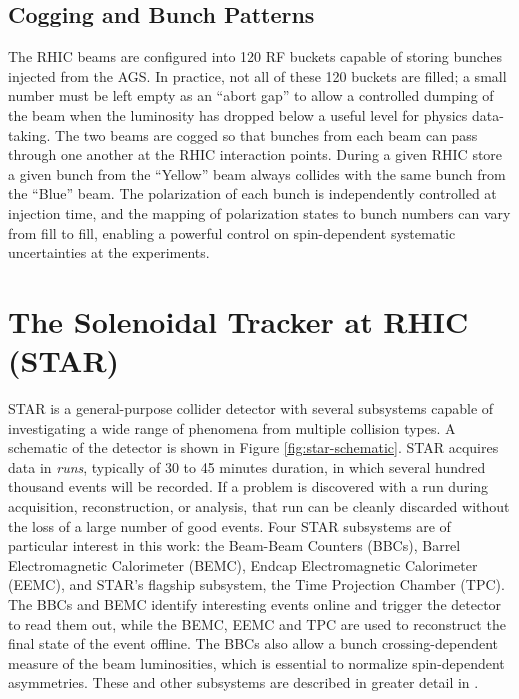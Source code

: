 \subsection{Cogging and Bunch Patterns}

The RHIC beams are configured into 120 RF buckets capable of storing bunches injected from the AGS.  In practice, not all of these 120 buckets are filled; a small number must be left empty as an ``abort gap'' to allow a controlled dumping of the beam when the luminosity has dropped below a useful level for physics data-taking.  The two beams are cogged so that bunches from each beam can pass through one another at the RHIC interaction points.  During a given RHIC store a given bunch from the ``Yellow'' beam always collides with the same bunch from the ``Blue'' beam.  The polarization of each bunch is independently controlled at injection time, and the mapping of polarization states to bunch numbers can vary from fill to fill, enabling a powerful control on spin-dependent systematic uncertainties at the experiments.

\section{The Solenoidal Tracker at RHIC (STAR)}

STAR \cite{Ackermann:2002ad} is a general-purpose collider detector with several subsystems capable of investigating a wide range of phenomena from multiple collision types.  A schematic of the detector is shown in Figure \ref{fig:star-schematic}.  STAR acquires data in \textit{runs}, typically of 30 to 45 minutes duration, in which several hundred thousand events will be recorded.  If a problem is discovered with a run during acquisition, reconstruction, or analysis, that run can be cleanly discarded without the loss of a large number of good events.  Four STAR subsystems are of particular interest in this work: the Beam-Beam Counters (BBCs), Barrel Electromagnetic Calorimeter (BEMC), Endcap Electromagnetic Calorimeter (EEMC), and STAR's flagship subsystem, the Time Projection Chamber (TPC).  The BBCs and BEMC identify interesting events online and trigger the detector to read them out, while the BEMC, EEMC and TPC are used to reconstruct the final state of the event offline.  The BBCs also allow a bunch crossing-dependent measure of the beam luminosities, which is essential to normalize spin-dependent asymmetries.  These and other subsystems are described in greater detail in \cite{RHIC-Special-Issue}.

